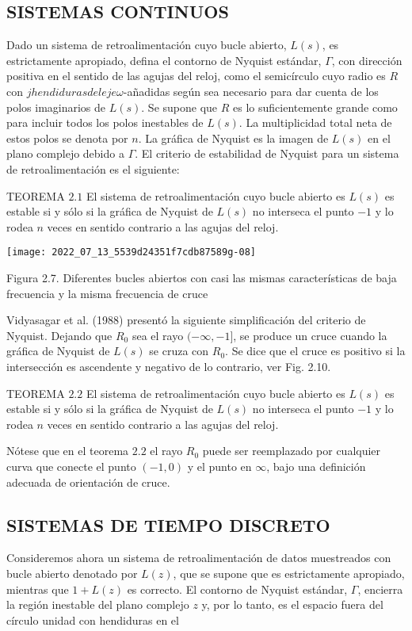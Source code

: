 \subsection{SISTEMAS CONTINUOS}
Dado un sistema de retroalimentación cuyo bucle abierto, $L(s)$, es estrictamente apropiado, defina el contorno de Nyquist estándar, $\Gamma$, con dirección positiva en el sentido de las agujas del reloj, como el semicírculo cuyo radio es $R$ con $j hendiduras del eje \omega$-añadidas según sea necesario para dar cuenta de los polos imaginarios de $L(s)$. Se supone que $R$ es lo suficientemente grande como para incluir todos los polos inestables de $L(s)$. La multiplicidad total neta de estos polos se denota por $n$. La gráfica de Nyquist es la imagen de $L(s)$ en el plano complejo debido a $\Gamma$. El criterio de estabilidad de Nyquist para un sistema de retroalimentación es el siguiente:

TEOREMA $2.1$ El sistema de retroalimentación cuyo bucle abierto es $L(s)$ es estable si y sólo si la gráfica de Nyquist de $L(s)$ no interseca el punto $-1$ y lo rodea $n$ veces en sentido contrario a las agujas del reloj.

\texttt{[image: 2022\_07\_13\_5539d24351f7cdb87589g-08]}

Figura 2.7. Diferentes bucles abiertos con casi las mismas características de baja frecuencia y la misma frecuencia de cruce

Vidyasagar et al. (1988) presentó la siguiente simplificación del criterio de Nyquist. Dejando que $R_{0}$ sea el rayo $(-\infty,-1]$, se produce un cruce cuando la gráfica de Nyquist de $L(s)$ se cruza con $R_{0}$. Se dice que el cruce es positivo si la intersección es ascendente y negativo de lo contrario, ver Fig. 2.10.

TEOREMA $2.2$ El sistema de retroalimentación cuyo bucle abierto es $L(s)$ es estable si y sólo si la gráfica de Nyquist de $L(s)$ no interseca el punto $-1$ y lo rodea $n$ veces en sentido contrario a las agujas del reloj.

Nótese que en el teorema $2.2$ el rayo $R_{0}$ puede ser reemplazado por cualquier curva que conecte el punto $(-1,0)$ y el punto en $\infty$, bajo una definición adecuada de orientación de cruce.

\subsection{SISTEMAS DE TIEMPO DISCRETO}
Consideremos ahora un sistema de retroalimentación de datos muestreados con bucle abierto denotado por $L(z)$, que se supone que es estrictamente apropiado, mientras que $1+L(z)$ es correcto. El contorno de Nyquist estándar, $\Gamma$, encierra la región inestable del plano complejo $z$ y, por lo tanto, es el espacio fuera del círculo unidad con hendiduras en el\\

